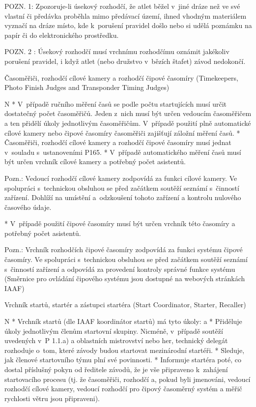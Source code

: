 POZN. 1: Zpozoruje-li úsekový rozhodčí, že atlet běžel v~jiné dráze než ve své vlastní či předávka proběhla mimo předávací území, ihned vhodným materiálem vyznačí na dráze místo, kde k~porušení pravidel došlo nebo si udělá poznámku na papír či do elektronického prostředku.

POZN. 2 : Úsekový rozhodčí musí vrchnímu rozhodčímu oznámit jakékoliv porušení pravidel, i když atlet (nebo družstvo v~bězích štafet) závod nedokončí.

\secc Časoměřiči, rozhodčí cílové kamery a rozhodčí čipové časomíry (Timekeepers, Photo Finish Judges and Transponder Timing Judges)

\begitems \style N
* V~případě ručního měření časů se podle počtu startujících musí určit dostatečný počet časoměřičů. Jeden z~nich musí být určen vedoucím časoměřičem a ten přidělí úkoly jednotlivým časoměřičům. V~případě použití plně automatické cílové kamery nebo čipové časomíry časoměřiči zajišťují záložní měření časů.
* Časoměřiči, rozhodčí cílové kamery a rozhodčí čipové časomíry musí jednat v~souladu s~ustanoveními P165.
* V~případě automatického měření časů musí být určen vrchník cílové kamery a potřebný počet asistentů.

Pozn.: Vedoucí rozhodčí cílové kamery zodpovídá za funkci cílové kamery. Ve spolupráci s~technickou obsluhou se před začátkem soutěží seznámí s~činností zařízení. Dohlíží na umístění a~odzkoušení tohoto zařízení a kontrolu nulového časového údaje.

* V~případě použití čipové časomíry musí být určen vrchník této časomíry a potřebný počet asistentů.

Pozn.: Vrchník rozhodčích čipové časomíry zodpovídá za funkci systému čipové časomíry. Ve spolupráci s~technickou obsluhou se před začátkem soutěží seznámí s~činností zařízení a odpovídá za provedení kontroly správné funkce systému (Směrnice pro ovládání čipového systému jsou dostupné na webových stránkách IAAF)
\enditems

\secc Vrchník startů, startér a zástupci startéra (Start Coordinator, Starter, Recaller)

\begitems \style N
* Vrchník startů (dle IAAF koordinátor startů) má tyto úkoly:
  \begitems \style a
  * Přiděluje úkoly jednotlivým členům startovní skupiny. Nicméně, v~případě soutěží uvedených v~P 1.1.a) a oblastních mistrovství nebo her, technický delegát rozhoduje o~tom, které závody budou startovat mezinárodní startéři.
  * Sleduje, jak členové startovního týmu plní své povinnosti.
  * Informuje startéra poté, co dostal příslušný pokyn od ředitele závodů, že je vše připraveno k~zahájení startovacího procesu (tj. že časoměřiči, rozhodčí a, pokud byli jmenováni, vedoucí rozhodčí cílové kamery, vedoucí rozhodčí pro čipový časoměrný systém a měřič rychlosti větru jsou připraveni).

